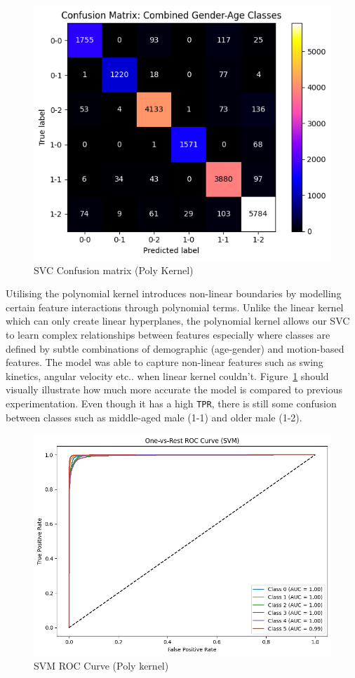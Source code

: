 \documentclass[10pt,twocolumn]{article}
\begin{document}
\begin{figure}[H]
    \centering
    \includegraphics[width=1\linewidth]{images/svm/svm-cm-poly.png}
    \caption{SVC Confusion matrix (Poly Kernel)}
    \label{fig:svm-poly-cm}
\end{figure}
Utilising the polynomial kernel introduces non-linear boundaries by modelling certain feature interactions through polynomial terms. Unlike the linear kernel which can only create linear hyperplanes, the polynomial kernel allows our SVC to learn complex relationships between features especially where classes are defined by subtle combinations of demographic (age-gender) and motion-based features. The model was able to capture non-linear features such as swing kinetics, angular velocity etc.. when linear kernel couldn't.
Figure~\ref{fig:svm-poly-cm} should visually illustrate how much more accurate the model is compared to previous experimentation. Even though it has a high \texttt{TPR}, there is still some confusion between classes such as middle-aged male (1-1) and older male (1-2).
\begin{figure}[H]
    \centering
    \includegraphics[width=1\linewidth]{images/svm/svm-poly-roc.png}
    \caption{SVM ROC Curve (Poly kernel)}
    \label{fig:svm-roc-poly}
\end{figure}
\end{document}
